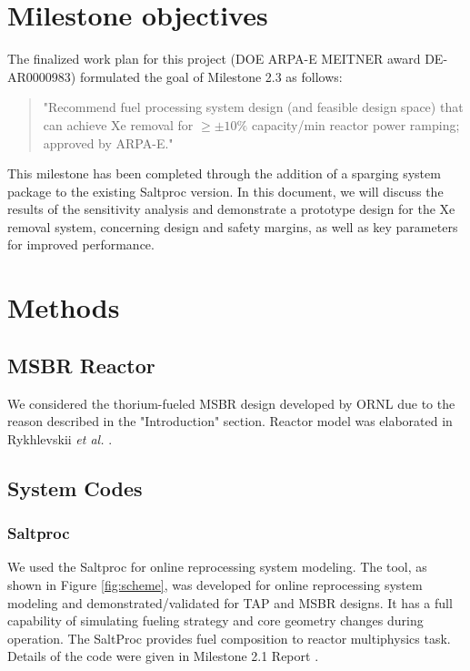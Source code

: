 \section{Milestone objectives}

    The finalized work plan for this project (DOE ARPA-E MEITNER award DE-AR0000983) formulated the goal of Milestone 2.3 as follows:

    \begin{quotation}
        "Recommend fuel processing system design (and feasible design
        space) that can achieve Xe removal for $\ge \pm 10\%$ capacity/min reactor power ramping; approved by ARPA-E."
    \end{quotation}

    This milestone has been completed through the addition of a sparging system package to the existing Saltproc version. In this document, we will discuss the results of the sensitivity analysis and demonstrate a prototype design for the Xe removal system, concerning design and safety margins, as well as key parameters for improved performance.

\section{Methods}

\subsection{MSBR Reactor}

    We considered the thorium-fueled MSBR design \cite{robertson_conceptual_1971} developed by ORNL due to the reason described in the "Introduction" section. Reactor model was elaborated in Rykhlevskii \emph{et al.} \cite{rykhlevskii_modeling_2019}.

\subsection{System Codes}

\subsubsection{Saltproc}

    We used the Saltproc \cite{rykhlevskii_saltproc_2018} for online reprocessing system modeling. The tool, as shown in Figure \ref{fig:scheme}, was developed for online reprocessing system modeling and demonstrated/validated for TAP and MSBR designs. It has a full capability of simulating fueling strategy and core geometry changes during operation. The SaltProc provides fuel composition to reactor multiphysics task. Details of the code were given in Milestone 2.1 Report \cite{rykhlevskii_milestone_2019}.

